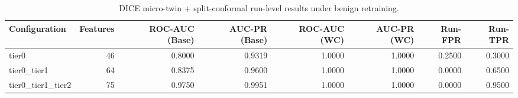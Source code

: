 \begin{table}[t]
\centering
\caption{DICE micro-twin + split-conformal run-level results under benign retraining.}
\label{tab:dice_full_overall}
\footnotesize
\begin{tabular}{lrrrrrrr}
\toprule
Configuration & Features & ROC-AUC (Base) & AUC-PR (Base) & ROC-AUC (WC) & AUC-PR (WC) & Run-FPR & Run-TPR \\
\midrule
tier0 & 46 & 0.8000 & 0.9319 & 1.0000 & 1.0000 & 0.2500 & 0.3000 \\
tier0_tier1 & 64 & 0.8375 & 0.9600 & 1.0000 & 1.0000 & 0.0000 & 0.6500 \\
tier0_tier1_tier2 & 75 & 0.9750 & 0.9951 & 1.0000 & 1.0000 & 0.0000 & 0.9500 \\
\bottomrule
\end{tabular}

\end{table}
